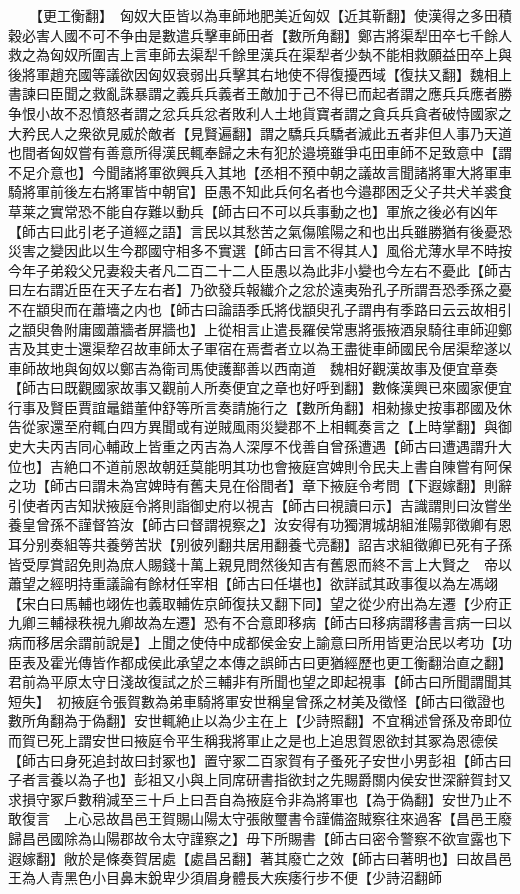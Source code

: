 　　【更工衡翻】　匈奴大臣皆以為車師地肥美近匈奴【近其靳翻】使漢得之多田積穀必害人國不可不争由是數遣兵擊車師田者【數所角翻】鄭吉將渠犁田卒七千餘人救之為匈奴所圍吉上言車師去渠犁千餘里漢兵在渠犁者少埶不能相救願益田卒上與後將軍趙充國等議欲因匈奴衰弱出兵擊其右地使不得復擾西域【復扶又翻】魏相上書諫曰臣聞之救亂誅暴謂之義兵兵義者王敵加于己不得已而起者謂之應兵兵應者勝争恨小故不忍憤怒者謂之忿兵兵忿者敗利人土地貨寶者謂之貪兵兵貪者破恃國家之大矜民人之衆欲見威於敵者【見賢遍翻】謂之驕兵兵驕者滅此五者非但人事乃天道也間者匈奴嘗有善意所得漢民輒奉歸之未有犯於邉境雖爭屯田車師不足致意中【謂不足介意也】今聞諸將軍欲興兵入其地【丞相不預中朝之議故言聞諸將軍大將軍車騎將軍前後左右將軍皆中朝官】臣愚不知此兵何名者也今邉郡困乏父子共犬羊裘食草莱之實常恐不能自存難以動兵【師古曰不可以兵事動之也】軍旅之後必有凶年【師古曰此引老子道經之語】言民以其愁苦之氣傷隂陽之和也出兵雖勝猶有後憂恐災害之變因此以生今郡國守相多不實選【師古曰言不得其人】風俗尤薄水旱不時按今年子弟殺父兄妻殺夫者凡二百二十二人臣愚以為此非小變也今左右不憂此【師古曰左右謂近臣在天子左右者】乃欲發兵報纎介之忿於遠夷殆孔子所謂吾恐季孫之憂不在顓臾而在蕭墻之内也【師古曰論語季氏將伐顓臾孔子謂冉有季路曰云云故相引之顓臾魯附庸國蕭牆者屏牆也】上從相言止遣長羅侯常惠將張掖酒泉騎往車師迎鄭吉及其吏士還渠犂召故車師太子軍宿在焉耆者立以為王盡徙車師國民令居渠犂遂以車師故地與匈奴以鄭吉為衛司馬使護鄯善以西南道　魏相好觀漢故事及便宜章奏【師古曰既觀國家故事又觀前人所奏便宜之章也好呼到翻】數條漢興已來國家便宜行事及賢臣賈誼鼂錯董仲舒等所言奏請施行之【數所角翻】相勑掾史按事郡國及休告從家還至府輒白四方異聞或有逆賊風雨災變郡不上相輒奏言之【上時掌翻】與御史大夫丙吉同心輔政上皆重之丙吉為人深厚不伐善自曾孫遭遇【師古曰遭遇謂升大位也】吉絶口不道前恩故朝廷莫能明其功也會掖庭宫婢則令民夫上書自陳嘗有阿保之功【師古曰謂未為宫婢時有舊夫見在俗間者】章下掖庭令考問【下遐嫁翻】則辭引使者丙吉知狀掖庭令將則詣御史府以視吉【師古曰視讀曰示】吉識謂則曰汝嘗坐養皇曾孫不謹督笞汝【師古曰督謂視察之】汝安得有功獨渭城胡組淮陽郭徵卿有恩耳分别奏組等共養勞苦狀【别彼列翻共居用翻養弋亮翻】詔吉求組徵卿已死有子孫皆受厚賞詔免則為庶人賜錢十萬上親見問然後知吉有舊恩而終不言上大賢之　帝以蕭望之經明持重議論有餘材任宰相【師古曰任堪也】欲詳試其政事復以為左馮翊【宋白曰馬輔也翊佐也義取輔佐京師復扶又翻下同】望之從少府出為左遷【少府正九卿三輔禄秩視九卿故為左遷】恐有不合意即移病【師古曰移病謂移書言病一曰以病而移居余謂前說是】上聞之使侍中成都侯金安上諭意曰所用皆更治民以考功【功臣表及霍光傳皆作都成侯此承望之本傳之誤師古曰更猶經歷也更工衡翻治直之翻】君前為平原太守日淺故復試之於三輔非有所聞也望之即起視事【師古曰所聞謂聞其短失】　初掖庭令張賀數為弟車騎將軍安世稱皇曾孫之材美及徵怪【師古曰徵證也數所角翻為于偽翻】安世輒絶止以為少主在上【少詩照翻】不宜稱述曾孫及帝即位而賀已死上謂安世曰掖庭令平生稱我將軍止之是也上追思賀恩欲封其冢為恩德侯【師古曰身死追封故曰封冢也】置守冢二百家賀有子蚤死子安世小男彭祖【師古曰子者言養以為子也】彭祖又小與上同席研書指欲封之先賜爵關内侯安世深辭賀封又求損守冢戶數稍減至三十戶上曰吾自為掖庭令非為將軍也【為于偽翻】安世乃止不敢復言　上心忌故昌邑王賀賜山陽太守張敞璽書令謹備盗賊察往來過客【昌邑王廢歸昌邑國除為山陽郡故令太守謹察之】毋下所賜書【師古曰密令警察不欲宣露也下遐嫁翻】敞於是條奏賀居處【處昌呂翻】著其廢亡之效【師古曰著明也】曰故昌邑王為人青黑色小目鼻末銳卑少須眉身體長大疾痿行步不便【少詩沼翻師